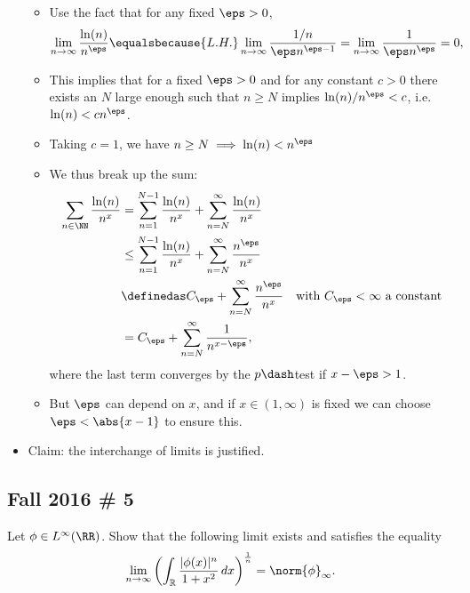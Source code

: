 \begin{solution}
\begin{itemize}
  \begin{itemize}
  \item
    Use the fact that for any fixed \(\eps>0\),
    \begin{align*}  
    \lim_{n\to\infty} {\ln(n) \over n^\eps} 
    \equalsbecause{L.H.} \lim_{n\to\infty}{1/n \over \eps n^{\eps-1}} 
    = \lim_{n\to\infty} {1\over \eps n^\eps} = 0
    ,\end{align*}
  \item
    This implies that for a fixed \(\eps >0\) and for any constant
    \(c>0\) there exists an \(N\) large enough such that \(n\geq N\)
    implies \(\ln(n)/n^\eps < c\), i.e.~\(\ln(n) < c n^{\eps}\).
  \item
    Taking \(c=1\), we have \(n\geq N \implies \ln(n) < n^\eps\)
  \item
    We thus break up the sum:
    \begin{align*}  
    \sum_{n\in \NN} {\ln(n) \over n^x} 
    &= \sum_{n=1}^{N-1} { \ln(n) \over n^x} + \sum_{n=N}^\infty {\ln(n) \over n^x} \\
    &\leq \sum_{n=1}^{N-1} { \ln(n) \over n^x} + \sum_{n=N}^\infty {n^\eps \over n^x} \\
    &\definedas C_\eps + \sum_{n=N}^\infty {n^\eps \over n^x} \quad \text{with $C_\eps<\infty$ a constant}\\
    &= C_\eps + \sum_{n=N}^\infty {1 \over n^{x-\eps}}
    ,\end{align*} where the last term converges by the \(p\dash\)test if
    \(x-\eps > 1\).
  \item
    But \(\eps\) can depend on \(x\), and if \(x\in (1, \infty)\) is
    fixed we can choose \(\eps < \abs{x-1}\) to ensure this.
  \end{itemize}
\item
  Claim: the interchange of limits is justified. 
\end{itemize}

\end{solution}

\hypertarget{fall-2016-5}{%
\subsection{Fall 2016 \# 5}\label{fall-2016-5}}

Let \(\phi\in L^\infty(\RR)\). Show that the following limit exists and
satisfies the equality
\begin{align*}
\lim _{n \to \infty} \left(\int _{\mathbb{R}} \frac{|\phi(x)|^{n}}{1+x^{2}} \, dx \right) ^ {\frac{1}{n}} 
= \norm{\phi}_\infty.
\end{align*} 

